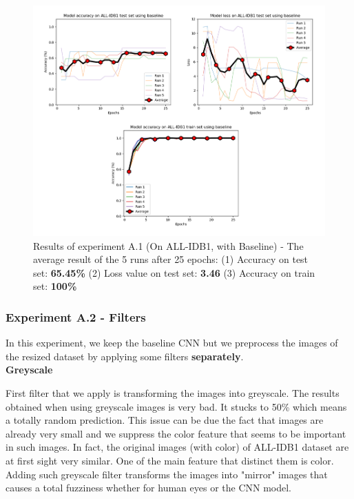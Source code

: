 \documentclass[11pt, openany]{report}
\theoremstyle{plain}
\theoremstyle{definition}
\theoremstyle{remark}
\begin{document}
\begin{figure}[H]
  \centering
  \includegraphics[scale=0.5]{Code/ch6-LeukemiaSubtypes/figures_result/ALL_IDB1/all_idb1-baseline.PNG}
  \caption{Results of experiment A.1 (On ALL-IDB1, with Baseline) - The average result of the 5 runs after 25 epochs: (1) Accuracy on test set: \textbf{65.45\%} (2) Loss value on test set: \textbf{3.46} (3) Accuracy on train set: \textbf{100\%}}
  \label{fig:results-A1}
\end{figure}


\subsubsection{Experiment A.2 - Filters}
In this experiment, we keep the baseline CNN but we preprocess the images of the resized dataset by applying some filters \textbf{separately}. \\

\textbf{Greyscale}

First filter that we apply is transforming the images into greyscale. The results obtained when using greyscale images is very bad. It stucks to 50\% which means a totally random prediction. This issue can be due the fact that images are already very small and we suppress the color feature that seems to be important in such images. In fact, the original images (with color) of ALL-IDB1 dataset are at first sight very similar. One of the main feature that distinct them is color. Adding such greyscale filter transforms the images into "mirror" images that causes a total fuzziness whether for human eyes or the CNN model. \\ 
\end{document}
